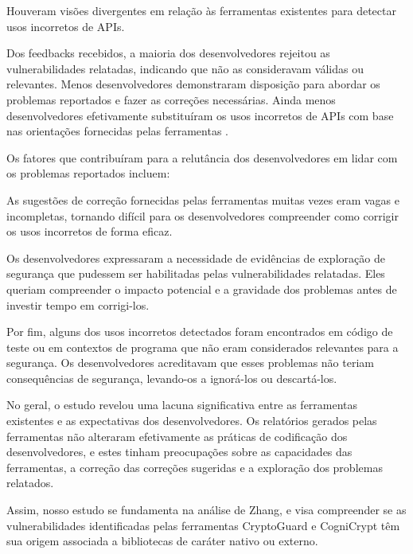 Houveram visões divergentes em relação às ferramentas existentes para detectar usos incorretos de APIs. 

Dos feedbacks recebidos, a maioria dos desenvolvedores rejeitou as vulnerabilidades relatadas, indicando que não as consideravam válidas ou relevantes. Menos desenvolvedores demonstraram disposição para abordar os problemas reportados e fazer as correções necessárias. Ainda menos desenvolvedores efetivamente substituíram os usos incorretos de APIs com base nas orientações fornecidas pelas ferramentas \cite{api_misuses_zhang}.

Os fatores que contribuíram para a relutância dos desenvolvedores em lidar com os problemas reportados incluem: 

As sugestões de correção fornecidas pelas ferramentas muitas vezes eram vagas e incompletas, tornando difícil para os desenvolvedores compreender como corrigir os usos incorretos de forma eficaz. 

Os desenvolvedores expressaram a necessidade de evidências de exploração de segurança que pudessem ser habilitadas pelas vulnerabilidades relatadas. Eles queriam compreender o impacto potencial e a gravidade dos problemas antes de investir tempo em corrigi-los. 

Por fim, alguns dos usos incorretos detectados foram encontrados em código de teste ou em contextos de programa que não eram considerados relevantes para a segurança. Os desenvolvedores acreditavam que esses problemas não teriam consequências de segurança, levando-os a ignorá-los ou descartá-los.

No geral, o estudo revelou uma lacuna significativa entre as ferramentas existentes e as expectativas dos desenvolvedores. Os relatórios gerados pelas ferramentas não alteraram efetivamente as práticas de codificação dos desenvolvedores, e estes tinham preocupações sobre as capacidades das ferramentas, a correção das correções sugeridas e a exploração dos problemas relatados.

Assim, nosso estudo se fundamenta na análise de Zhang, e visa compreender se as vulnerabilidades identificadas pelas ferramentas CryptoGuard e CogniCrypt têm sua origem associada a bibliotecas de caráter nativo ou externo. 



